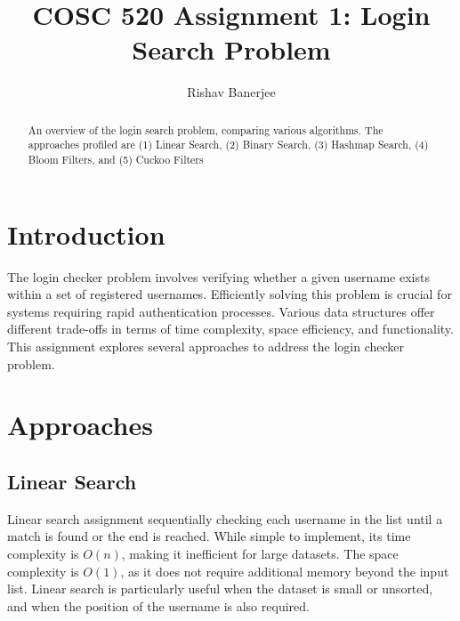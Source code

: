\documentclass[acmsmall,screen, nonacm]{acmart}
\begin{document}
\title{COSC 520 Assignment 1: Login Search Problem}

\author{Rishav Banerjee}

\renewcommand{\shortauthors}{Banerjee}

\begin{abstract}
	An overview of the login search problem, comparing various algorithms.
	The approaches profiled are (1) Linear Search, (2) Binary Search, (3) Hashmap Search, (4) Bloom Filters, and (5) Cuckoo Filters
\end{abstract}

\maketitle

\section{Introduction}
The login checker problem involves verifying whether a given username exists within a set of registered usernames.
Efficiently solving this problem is crucial for systems requiring rapid authentication processes.
Various data structures offer different trade-offs in terms of time complexity, space efficiency, and functionality.
This assignment explores several approaches to address the login checker problem.

\section{Approaches}

\subsection{Linear Search}
Linear search assignment sequentially checking each username in the list until a match is found or the end is reached.
While simple to implement, its time complexity is \(O(n)\), making it inefficient for large datasets.
The space complexity is \(O(1)\), as it does not require additional memory beyond the input list.
Linear search is particularly useful when the dataset is small or unsorted, and when the position of the username is also required.
\end{document}
